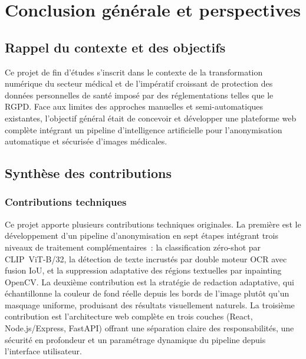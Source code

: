 \chapter*{Conclusion générale et perspectives}

\section*{Rappel du contexte et des objectifs}

Ce projet de fin d'études s'inscrit dans le contexte de la transformation numérique du secteur médical et de l'impératif croissant de protection des données personnelles de santé imposé par des réglementations telles que le RGPD. Face aux limites des approches manuelles et semi-automatiques existantes, l'objectif général était de concevoir et développer une plateforme web complète intégrant un pipeline d'intelligence artificielle pour l'anonymisation automatique et sécurisée d'images médicales.

\section*{Synthèse des contributions}

\subsection*{Contributions techniques}

Ce projet apporte plusieurs contributions techniques originales. La première est le développement d'un pipeline d'anonymisation en sept étapes intégrant trois niveaux de traitement complémentaires~: la classification zéro-shot par CLIP~ViT-B/32, la détection de texte incrustés par double moteur OCR avec fusion IoU, et la suppression adaptative des régions textuelles par inpainting OpenCV. La deuxième contribution est la stratégie de redaction adaptative, qui échantillonne la couleur de fond réelle depuis les bords de l'image plutôt qu'un masquage uniforme, produisant des résultats visuellement naturels. La troisième contribution est l'architecture web complète en trois couches (React, Node.js/Express, FastAPI) offrant une séparation claire des responsabilités, une sécurité en profondeur et un paramétrage dynamique du pipeline depuis l'interface utilisateur.

